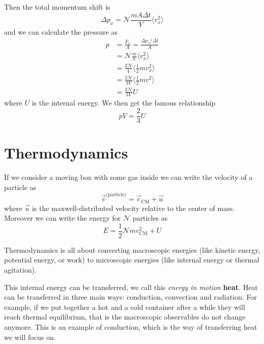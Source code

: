 \documentclass[12pt]{extarticle}
\newcommand{\anglebraces}[1]{
    \langle #1 \rangle
}
\begin{document}
Then the total momentum shift is
\begin{equation}
    \Delta p_x = \mathscr{N} \frac{m A \Delta t}{V} \anglebraces{v_x^2}
\end{equation}
and we can calculate the pressure as
\begin{align}
    p & = \frac{F_x}{A} = \frac{\Delta p_x / \Delta t}{A}          \\
      & = \mathscr{N} \frac{m}{V} \anglebraces{v_x^2}              \\
      & = \frac{2 \mathscr{N}}{V} \anglebraces{\frac{1}{2}m v_x^2} \\
      & = \frac{2 \mathscr{N}}{3 V} \anglebraces{\frac{1}{2}m v^2} \\
      & = \frac{2 \mathscr{N}}{3 V} U
\end{align}
where $U$ is the internal energy. We then get the famous relationship
\begin{equation}
    \label{eq:gas:internal_energy}
    pV = \frac{2}{3}U
\end{equation}

\section{Thermodynamics}

If we consider a moving box with some gas inside we can write the velocity of a particle as
\begin{equation}
    \vec v^{\text{(particle)}} = \vec c_{\text{CM}} + \vec u
\end{equation}
where $\vec u$ is the maxwell-distributed velocity relative to the center of mass.
Moreover we can write the energy for $\mathscr{N}$ particles as
\begin{equation}
    E = \frac{1}{2} \mathscr{N} m v_{\text{CM}}^2 + U
\end{equation}

Thermodynamics is all about converting macroscopic energies (like kinetic energy, potential energy, or work) to microscopic energies (like internal energy or thermal agitation).

This internal energy can be transferred, we call this \emph{energy in motion} \textbf{heat}.
Heat can be transferred in three main ways: conduction, convection and radiation.
For example, if we put together a hot and a cold container after a while they will reach thermal equilibrium, that is the macroscopic observables do not change anymore.
This is an example of conduction, which is the way of transferring heat we will focus on.
\end{document}

